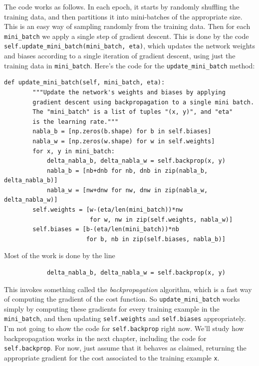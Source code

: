 The code works as follows. In each epoch, it starts by randomly shuffling the training data, and then partitions it into mini-batches of the appropriate size. This is an easy way of sampling randomly from the training data. Then for each \texttt{mini\_batch} we apply a single step of gradient descent. This is done by the code \texttt{self.update\_mini\_batch(mini\_batch, eta)}, which updates the network weights and biases according to a single iteration of gradient descent, using just the training data in \texttt{mini\_batch}. Here's the code for the \texttt{update\_mini\_batch} method:

\begin{lstlisting}
def update_mini_batch(self, mini_batch, eta):
        """Update the network's weights and biases by applying
        gradient descent using backpropagation to a single mini batch.
        The "mini_batch" is a list of tuples "(x, y)", and "eta"
        is the learning rate."""
        nabla_b = [np.zeros(b.shape) for b in self.biases]
        nabla_w = [np.zeros(w.shape) for w in self.weights]
        for x, y in mini_batch:
            delta_nabla_b, delta_nabla_w = self.backprop(x, y)
            nabla_b = [nb+dnb for nb, dnb in zip(nabla_b, delta_nabla_b)]
            nabla_w = [nw+dnw for nw, dnw in zip(nabla_w, delta_nabla_w)]
        self.weights = [w-(eta/len(mini_batch))*nw 
                        for w, nw in zip(self.weights, nabla_w)]
        self.biases = [b-(eta/len(mini_batch))*nb 
                       for b, nb in zip(self.biases, nabla_b)]
\end{lstlisting}

Most of the work is done by the line

\begin{lstlisting}
            delta_nabla_b, delta_nabla_w = self.backprop(x, y)
\end{lstlisting}

This invokes something called the \textit{backpropagation} algorithm, which is a fast way of computing the gradient of the cost function. So \texttt{update\_mini\_batch} works simply by computing these gradients for every training example in the \texttt{mini\_batch}, and then updating \texttt{self.weights} and \texttt{self.biases} appropriately.\\

I'm not going to show the code for \texttt{self.backprop} right now. We'll study how backpropagation works in the next chapter, including the code for \texttt{self.backprop}. For now, just assume that it behaves as claimed, returning the appropriate gradient for the cost associated to the training example \texttt{x}.\\

